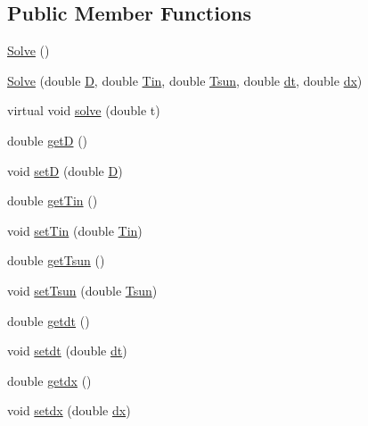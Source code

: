 \subsection*{Public Member Functions}
\begin{DoxyCompactItemize}
\item 
\hyperlink{class_solve_ac437f1307c9d4669205ac7d370a55ffc}{Solve} ()
\item 
\hyperlink{class_solve_a1e0efad6dcf6b09759dd38df7aa08db8}{Solve} (double \hyperlink{class_solve_ab6b73352e9bca73bad1b133fc84f008c}{D}, double \hyperlink{class_solve_a324c747af91a26a206d7772853b8655e}{Tin}, double \hyperlink{class_solve_a7145536b49fb1ac4d2f36f800d118616}{Tsun}, double \hyperlink{class_solve_ac1befb9c006f895fb0517e19c412ca57}{dt}, double \hyperlink{class_solve_a21b9b8118f508e079f066d2ce2816dd1}{dx})
\item 
virtual void \hyperlink{class_solve_a1a56722993fdabea9928637d7dd8a2c7}{solve} (double t)
\item 
double \hyperlink{class_solve_a0edcf69bae8414576fbb1b35ba395a1c}{getD} ()
\item 
void \hyperlink{class_solve_ab313553673e1e419bcc150be13d3d58b}{setD} (double \hyperlink{class_solve_ab6b73352e9bca73bad1b133fc84f008c}{D})
\item 
double \hyperlink{class_solve_a7d9d481ed1bf8bbfc5bf37517e2a12c6}{get\+Tin} ()
\item 
void \hyperlink{class_solve_acef277ebf827a664b4378285a1fbeca3}{set\+Tin} (double \hyperlink{class_solve_a324c747af91a26a206d7772853b8655e}{Tin})
\item 
double \hyperlink{class_solve_afad3694fc830b80135a316eea2c0c279}{get\+Tsun} ()
\item 
void \hyperlink{class_solve_a2088840c7117930845bc61444cbba285}{set\+Tsun} (double \hyperlink{class_solve_a7145536b49fb1ac4d2f36f800d118616}{Tsun})
\item 
double \hyperlink{class_solve_a981e11c3c390bc54041a8e60ebdcc4bf}{getdt} ()
\item 
void \hyperlink{class_solve_af05556226469b3b7d4773b61342fbf73}{setdt} (double \hyperlink{class_solve_ac1befb9c006f895fb0517e19c412ca57}{dt})
\item 
double \hyperlink{class_solve_aad066a37070623f3c1bfb5f001fd2a50}{getdx} ()
\item 
void \hyperlink{class_solve_a60a27ba683584477189dc9c260c75127}{setdx} (double \hyperlink{class_solve_a21b9b8118f508e079f066d2ce2816dd1}{dx})
\end{DoxyCompactItemize}
